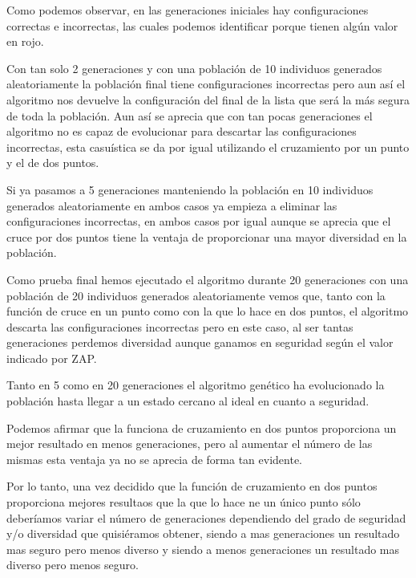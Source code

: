 Como podemos observar, en las generaciones iniciales hay configuraciones correctas e incorrectas, las cuales podemos identificar porque tienen algún valor en rojo. 

\bigskips
Con tan solo 2 generaciones y con una población de 10 individuos generados aleatoriamente la población final tiene configuraciones incorrectas pero aun así el algoritmo nos devuelve la configuración del final de la lista que será la más segura de toda la población. Aun así se aprecia que con tan pocas generaciones el algoritmo no es capaz de evolucionar para descartar las configuraciones incorrectas, esta casuística se da por igual utilizando el cruzamiento por un punto y el de dos puntos.

\bigskip
Si ya pasamos a 5 generaciones manteniendo la población en 10 individuos generados aleatoriamente en ambos casos ya empieza a eliminar las configuraciones incorrectas, en ambos casos por igual aunque se aprecia que el cruce por dos puntos tiene la ventaja de proporcionar una mayor diversidad en la población.

\bigskip
Como prueba final hemos ejecutado el algoritmo durante 20 generaciones con una población de 20 individuos generados aleatoriamente vemos que, tanto con la función de cruce en un punto como con la que lo hace en dos puntos, el algoritmo descarta las configuraciones incorrectas pero en este caso, al ser tantas generaciones perdemos diversidad aunque ganamos en seguridad según el valor indicado por ZAP.

\bigskip
Tanto en 5 como en 20 generaciones el algoritmo genético ha evolucionado la población hasta llegar a un estado cercano al ideal en cuanto a seguridad.

\bigskip
Podemos afirmar que la funciona de cruzamiento en dos puntos proporciona un mejor resultado en menos generaciones, pero al aumentar el número de las mismas esta ventaja ya no se aprecia de forma tan evidente.

\bigskip
Por lo tanto, una vez decidido que la función de cruzamiento en dos puntos proporciona mejores resultaos que la que lo hace ne un único punto sólo deberíamos variar el número de generaciones dependiendo del grado de seguridad y/o diversidad que quisiéramos obtener, siendo a mas generaciones un resultado mas seguro pero menos diverso y siendo a menos generaciones un resultado mas diverso pero menos seguro.

